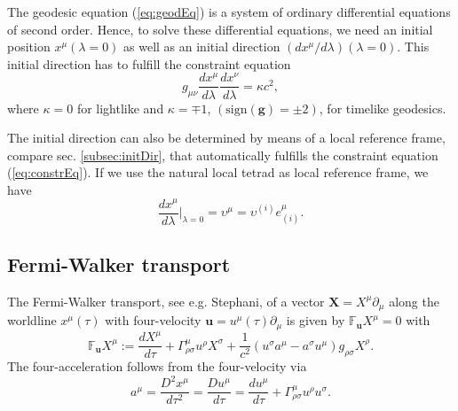 \documentclass[10pt,twoside,notitlepage,a4paper,fleqn,openbib]{report}
\def\sign{\textrm{sign}}
\def\defequal{:=}
\begin{document}
The geodesic equation (\ref{eq:geodEq}) is a system of ordinary differential equations of second order. Hence, to solve these differential equations, we need an initial position $x^{\mu}(\lambda=0)$ as well as an initial direction $(dx^{\mu}/d\lambda)(\lambda=0)$. This initial direction has to fulfill the constraint equation
\begin{equation}
  \label{eq:constrEq}
  g_{\mu\nu}\frac{dx^{\mu}}{d\lambda}\frac{dx^{\nu}}{d\lambda} = \kappa c^2,
\end{equation}
where $\kappa=0$ for lightlike and $\kappa=\mp 1$, $(\sign(\mathbf{g})=\pm 2)$, for timelike geodesics.

The initial direction can also be determined by means of a local reference frame, compare sec. \ref{subsec:initDir}, that automatically fulfills the constraint equation (\ref{eq:constrEq}). If we use the natural local tetrad as local reference frame, we have
\begin{equation}
 \frac{dx^{\mu}}{d\lambda}\bigg|_{\lambda=0}=\upsilon^{\mu}=\upsilon^{(i)}e_{(i)}^{\mu}.
\end{equation}



\subsection{Fermi-Walker transport}
The Fermi-Walker transport, see e.g. Stephani\cite{stephani1990}, of a vector $\mathbf{X}=X^{\mu}\partial_{\mu}$ along the worldline $x^{\mu}(\tau)$ with four-velocity $\mathbf{u}=u^{\mu}(\tau)\partial_{\mu}$ is given by $\mathbb{F}_{\mathbf{u}}X^{\mu}=0$ with
\begin{equation}
  \mathbb{F}_{\mathbf{u}}X^{\mu}\defequal\frac{dX^{\mu}}{d\tau} + \Gamma_{\rho\sigma}^{\mu}u^{\rho}X^{\sigma} + \frac{1}{c^2}\left(u^{\sigma}a^{\mu}-a^{\sigma}u^{\mu}\right)g_{\rho\sigma}X^{\rho}.
\end{equation}
The four-acceleration follows from the four-velocity via
\begin{equation}
  a^{\mu} = \frac{D^2x^{\mu}}{d\tau^2}=\frac{Du^{\mu}}{d\tau} = \frac{du^{\mu}}{d\tau} + \Gamma_{\rho\sigma}^{\mu}u^{\rho}u^{\sigma}.
\end{equation}

\end{document}
